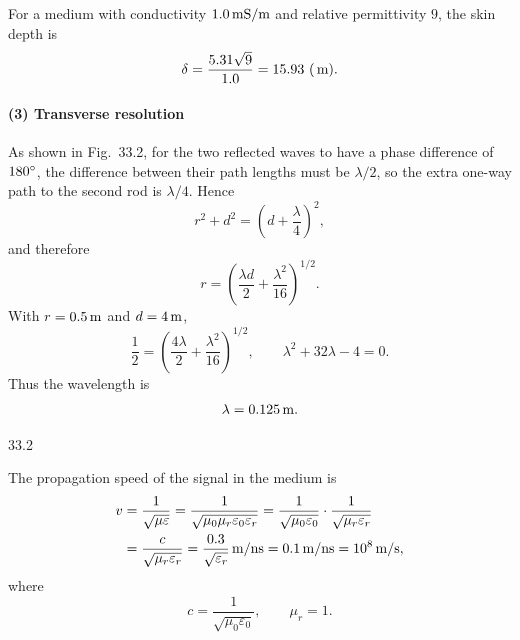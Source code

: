 For a medium with conductivity $1.0\,\mathrm{mS/m}$ and relative permittivity $9$, the skin depth is
\[
\delta=\frac{5.31\sqrt{9}}{1.0}=15.93\ (\unitv{m}).
\]

\paragraph{(3) Transverse resolution}

As shown in Fig.~33.2, for the two reflected waves to have a phase difference of $180^{\circ}$, the difference between their path lengths must be $\lambda/2$, so the extra one-way path to the second rod is $\lambda/4$. Hence
\[
r^2+d^2=\left(d+\frac{\lambda}{4}\right)^2,
\]
and therefore
\[
r=\left(\frac{\lambda d}{2}+\frac{\lambda^2}{16}\right)^{1/2}.
\]
With $r=0.5\,\mathrm{m}$ and $d=4\,\mathrm{m}$,
\[
\frac{1}{2}=\left(\frac{4\lambda}{2}+\frac{\lambda^2}{16}\right)^{1/2},
\qquad
\lambda^2+32\lambda-4=0.
\]
Thus the wavelength is
\[
\lambda=0.125\,\mathrm{m}.
\]

\begin{figbox}{33.2}
\end{figbox}

The propagation speed of the signal in the medium is
\begin{align*}
v&=\frac{1}{\sqrt{\mu\varepsilon}}
=\frac{1}{\sqrt{\mu_0\mu_r\varepsilon_0\varepsilon_r}}
=\frac{1}{\sqrt{\mu_0\varepsilon_0}}\cdot\frac{1}{\sqrt{\mu_r\varepsilon_r}}\\
&=\frac{c}{\sqrt{\mu_r\varepsilon_r}}
=\frac{0.3}{\sqrt{\varepsilon_r}}\,\mathrm{m/ns}
=0.1\,\mathrm{m/ns}=10^{8}\,\mathrm{m/s},
\end{align*}
where
\[
c=\frac{1}{\sqrt{\mu_0\varepsilon_0}},\qquad \mu_r=1.
\]


